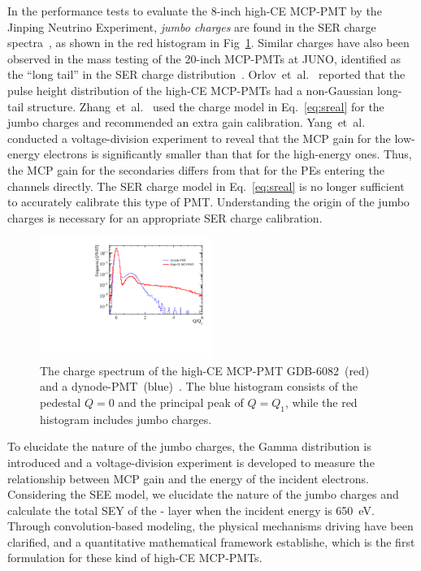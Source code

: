 In the performance tests to evaluate the 8-inch high-CE MCP-PMT by the Jinping Neutrino Experiment,
\emph{jumbo charges} are found in the SER charge spectra~\cite{Zhang:2023ued},
as shown in the red histogram in Fig~\ref{fig:spe_sreal}.
Similar charges have also been observed in the mass testing of the 20-inch MCP-PMTs at JUNO,
identified as the ``long tail'' in the SER charge distribution~\cite{JUNO:2022hlz}.
Orlov~et~al.~\cite{reviewer1} reported that the pulse height distribution of the high-CE MCP-PMTs had a non-Gaussian long-tail structure.
Zhang~et~al.~\cite{2021Gain} used the charge model in Eq.~\eqref{eq:sreal} for the jumbo charges and recommended an extra gain calibration.
Yang~et~al.~\cite{2017MCP} conducted a voltage-division experiment to reveal that the MCP gain for the low-energy electrons is significantly smaller than
that for the high-energy ones.
Thus, the MCP gain for the secondaries differs from that for the PEs entering the channels directly.
The SER charge model in Eq.~\eqref{eq:sreal} is no longer sufficient to accurately calibrate this type of PMT.
Understanding the origin of the jumbo charges is necessary for an appropriate SER charge calibration.

\begin{figure}[!htbp]
	\centering
	\includegraphics[width=0.5\textwidth]{PMTRelated/GTmodel/spe.pdf}
	\caption{The charge spectrum of the high-CE MCP-PMT GDB-6082~(red) and a dynode-PMT~(blue)~\cite{Zhang:2023ued}.
		The blue histogram consists of the pedestal $Q=0$ and the principal peak of $Q=Q_1$, while the red histogram includes jumbo charges.}
	\label{fig:spe_sreal}
\end{figure}

To elucidate the nature of the jumbo charges, the Gamma distribution is introduced and a voltage-division experiment is developed to measure the relationship
between MCP gain and the energy of the incident electrons.
Considering the SEE model, we elucidate the nature of the jumbo charges
and calculate the total SEY of the - layer when the incident energy is \SI{650}{eV}.
Through convolution-based modeling, the physical mechanisms driving have been clarified, and a quantitative mathematical framework establishe, which is the first formulation for these kind of high-CE MCP-PMTs.

